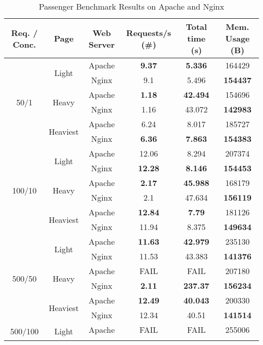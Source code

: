 \begin{table}[ht]
  \centering
  \caption{Passenger Benchmark Results on Apache and Nginx}
  \begin{tabular}{|c|c|c|c|c|c|}

\hline
  Req. / Conc. & Page & Web Server & Requests/s (\#) & Total time (s) & Mem. Usage (B) \\ \hline
\multirow{6}{*}{50/1} & \multirow{2}{*}{Light} & Apache & \textbf{9.37} & \textbf{5.336} & 164429\\\cline{3-6}
 &  & Nginx & 9.1 & 5.496 & \textbf{154437}\\\cline{2-6}
 & \multirow{2}{*}{Heavy} & Apache & \textbf{1.18} & \textbf{42.494} & 154696\\\cline{3-6}
 &  & Nginx & 1.16 & 43.072 & \textbf{142983}\\\cline{2-6}
 & \multirow{2}{*}{Heaviest} & Apache & 6.24 & 8.017 & 185727\\\cline{3-6}
 &  & Nginx & \textbf{6.36} & \textbf{7.863} & \textbf{154383}\\\hline
\multirow{6}{*}{100/10} & \multirow{2}{*}{Light} & Apache & 12.06 & 8.294 & 207374\\\cline{3-6}
 &  & Nginx & \textbf{12.28} & \textbf{8.146} & \textbf{154453}\\\cline{2-6}
 & \multirow{2}{*}{Heavy} & Apache & \textbf{2.17} & \textbf{45.988} & 168179\\\cline{3-6}
 &  & Nginx & 2.1 & 47.634 & \textbf{156119}\\\cline{2-6}
 & \multirow{2}{*}{Heaviest} & Apache & \textbf{12.84} & \textbf{7.79} & 181126\\\cline{3-6}
 &  & Nginx & 11.94 & 8.375 & \textbf{149634}\\\hline
\multirow{6}{*}{500/50} & \multirow{2}{*}{Light} & Apache & \textbf{11.63} & \textbf{42.979} & 235130\\\cline{3-6}
 &  & Nginx & 11.53 & 43.383 & \textbf{141376}\\\cline{2-6}
 & \multirow{2}{*}{Heavy} & Apache & FAIL & FAIL & 207180\\\cline{3-6}
 &  & Nginx & \textbf{2.11} & \textbf{237.37} & \textbf{156234}\\\cline{2-6}
 & \multirow{2}{*}{Heaviest} & Apache & \textbf{12.49} & \textbf{40.043} & 200330\\\cline{3-6}
 &  & Nginx & 12.34 & 40.51 & \textbf{141514}\\\hline
\multirow{6}{*}{500/100} & \multirow{2}{*}{Light} & Apache & FAIL & FAIL & 255006\\\cline{3-6}

\end{tabular}
\end{table}
